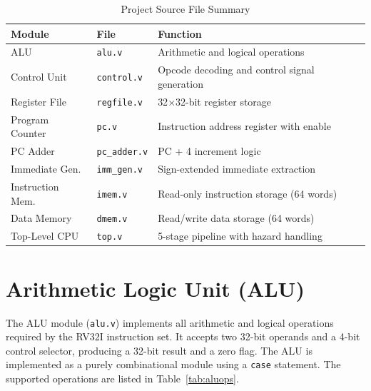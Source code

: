 \documentclass[12pt,a4paper]{report}
\begin{document}
\begin{table}[h!]
\centering
\caption{Project Source File Summary}
\label{tab:modules}
\begin{tabular}{L{3.2cm} L{2.4cm} L{6.8cm}}
    \toprule
    \textbf{Module} & \textbf{File} & \textbf{Function} \\
    \midrule
    ALU              & \texttt{alu.v}       & Arithmetic and logical operations \\
    Control Unit     & \texttt{control.v}   & Opcode decoding and control signal generation \\
    Register File    & \texttt{regfile.v}   & 32$\times$32-bit register storage \\
    Program Counter  & \texttt{pc.v}        & Instruction address register with enable \\
    PC Adder         & \texttt{pc\_adder.v} & PC + 4 increment logic \\
    Immediate Gen.   & \texttt{imm\_gen.v}  & Sign-extended immediate extraction \\
    Instruction Mem. & \texttt{imem.v}      & Read-only instruction storage (64 words) \\
    Data Memory      & \texttt{dmem.v}      & Read/write data storage (64 words) \\
    Top-Level CPU    & \texttt{top.v}       & 5-stage pipeline with hazard handling \\
    \bottomrule
\end{tabular}
\end{table}

\section{Arithmetic Logic Unit (ALU)}
The ALU module (\texttt{alu.v}) implements all arithmetic and logical operations
required by the RV32I instruction set. It accepts two 32-bit operands and a 4-bit
control selector, producing a 32-bit result and a zero flag. The ALU is implemented
as a purely combinational module using a \texttt{case} statement. The supported
operations are listed in Table~\ref{tab:aluops}.
\end{document}

